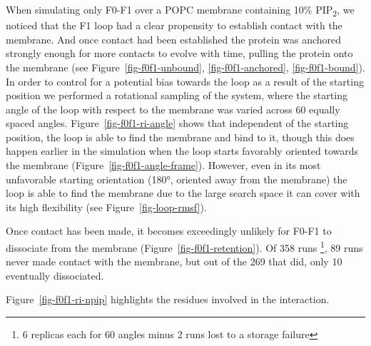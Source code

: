 \documentclass[
  letterpaper,
  DIV=11,
  numbers=noendperiod]{scrartcl}
\begin{document}
When simulating only F0-F1 over a POPC membrane containing 10\%
PIP\textsubscript{2}, we noticed that the F1 loop had a clear propensity
to establish contact with the membrane. And once contact had been
established the protein was anchored strongly enough for more contacts
to evolve with time, pulling the protein onto the membrane (see
Figure~\ref{fig-f0f1-unbound}, \ref{fig-f0f1-anchored}, \ref{fig-f0f1-bound}).
In order to control for a potential bias towards the loop as a result of
the starting position we performed a rotational sampling of the system,
where the starting angle of the loop with respect to the membrane was
varied across 60 equally spaced angles. Figure~\ref{fig-f0f1-ri-angle}
shows that independent of the starting position, the loop is able to
find the membrane and bind to it, though this does happen earlier in the
simulation when the loop starts favorably oriented towards the membrane
(Figure~\ref{fig-f0f1-angle-frame}). However, even in its most
unfavorable starting orientation (180°, oriented away from the membrane)
the loop is able to find the membrane due to the large search space it
can cover with its high flexibility (see Figure~\ref{fig-loop-rmsf}).

Once contact has been made, it becomes exceedingly unlikely for F0-F1 to
dissociate from the membrane (Figure~\ref{fig-f0f1-retention}). Of 358
runs \footnote{6 replicas each for 60 angles minus 2 runs lost to a
  storage failure}, 89 runs never made contact with the membrane, but
out of the 269 that did, only 10 eventually dissociated.

Figure~\ref{fig-f0f1-ri-npip} highlights the residues involved in the
interaction.
\end{document}
